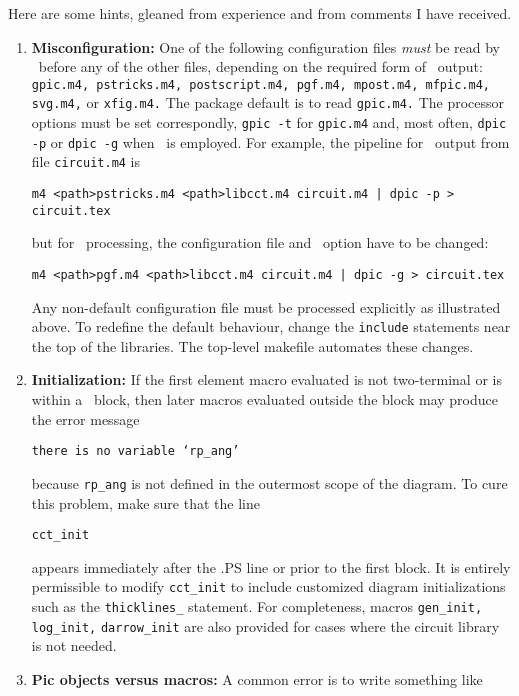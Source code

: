 Here are some hints, gleaned from experience and from comments I have
received.
\begin{enumerate}

\item {\bf Misconfiguration:} One of the following configuration files
  {\em must} be read by \Mfour\ before any of the other files, depending on the
  required form of \pic\ output:
    {\tt gpic.m4, pstricks.m4,
     postscript.m4,
     pgf.m4,
     mpost.m4, mfpic.m4, svg.m4,}
    or {\tt xfig.m4.}
  The package default is to read {\tt gpic.m4.}
  The processor options must be set correspondly,
  {\tt gpic -t} for {\tt gpic.m4} and, most often,
  {\tt dpic -p} or {\tt dpic -g} when \dpic\ is employed.
  For example, the pipeline for \PSTricks\ output from file {\tt circuit.m4} is

  {\tt m4 <path>pstricks.m4 <path>libcct.m4 circuit.m4 | dpic -p > circuit.tex}

  \noindent%
  but for \TPGF\ processing, the configuration file and \dpic\ option have to
  be changed:
  
  {\tt m4 <path>pgf.m4 <path>libcct.m4 circuit.m4 | dpic -g > circuit.tex}

  Any non-default configuration file must
  be processed explicitly as illustrated above.
  To redefine the default behaviour, change the {\tt include}
  statements near the top of the libraries.  The top-level makefile
  automates these changes.

\item 
{\bf Initialization:}
If the first element macro evaluated is not two-terminal or is within a
\Pic\ block, then later macros evaluated outside the block may produce
the error message

{\tt there is no variable `rp\_ang'}

\noindent because {\tt rp\_ang} is not defined in the outermost scope of the
diagram.  To cure this problem, make sure that the line

{\tt cct\_init}

\noindent appears immediately after the .PS line or prior to the first block.
It is entirely permissible to modify {\tt cct\_init} to include customized
diagram initializations such as the {\tt thicklines\_} statement.
For completeness, macros {\tt gen\_init,} {\tt log\_init,} {\tt darrow\_init}
are also provided for cases where the circuit library is not needed.

\item 
{\bf Pic objects versus macros:}  A common error is to write something like


\end{enumerate}

